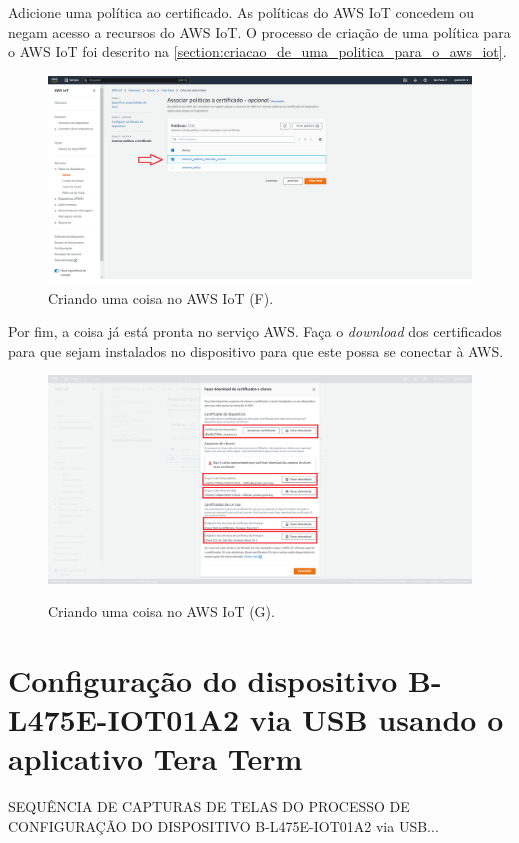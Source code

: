 Adicione uma política ao certificado. As políticas do AWS IoT concedem ou negam acesso a recursos do AWS IoT. O processo de criação de uma política para o AWS IoT foi descrito na \autoref{section:criacao_de_uma_politica_para_o_aws_iot}.

\begin{figure}[H]
    \centering
    \caption{Criando uma coisa no AWS IoT (F).}
    \includegraphics[scale=0.315]{Imagens/criando_uma_coisa_no_aws_iot_5.png}
\end{figure}

Por fim, a coisa já está pronta no serviço AWS. Faça o \textit{download} dos certificados para que sejam instalados no dispositivo para que este possa se conectar à AWS.

\begin{figure}[H]
    \centering
    \caption{Criando uma coisa no AWS IoT (G).}
    \includegraphics[scale=0.315]{Imagens/criando_uma_coisa_no_aws_iot_6.png}
    \label{fig:criacao_de_uma_coisa_no_aws_iot_g}
\end{figure}

\section{Configuração do dispositivo B-L475E-IOT01A2 via USB usando o aplicativo Tera Term}\label{section:configuracao_dispositivo_bl475eiot01a2_via_usb}

SEQUÊNCIA DE CAPTURAS DE TELAS DO PROCESSO DE CONFIGURAÇÃO DO DISPOSITIVO B-L475E-IOT01A2 via USB...
